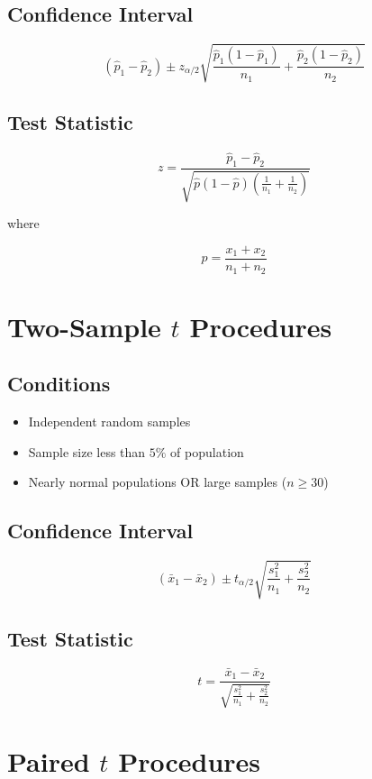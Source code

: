 \documentclass[11pt]{article}
\begin{document}
\subsection*{Confidence Interval}

\[
(\hat p_1 - \hat p_2)
\pm
z_{\alpha/2}
\sqrt{
\frac{\hat p_1(1-\hat p_1)}{n_1}
+
\frac{\hat p_2(1-\hat p_2)}{n_2}
}
\]

\subsection*{Test Statistic}

\[
z =
\frac{\hat p_1 - \hat p_2}
{\sqrt{\hat p(1-\hat p)
\left(\frac{1}{n_1}+\frac{1}{n_2}\right)}}
\]

where

\[
\hat p = \frac{x_1+x_2}{n_1+n_2}
\]

\section{Two-Sample $t$ Procedures}

\subsection*{Conditions}

\begin{itemize}
\item Independent random samples
\item Sample size less than $5\%$ of population
\item Nearly normal populations OR large samples ($n \ge 30$)
\end{itemize}

\subsection*{Confidence Interval}

\[
(\bar{x}_1 - \bar{x}_2)
\pm
t_{\alpha/2}
\sqrt{\frac{s_1^2}{n_1} + \frac{s_2^2}{n_2}}
\]

\subsection*{Test Statistic}

\[
t =
\frac{\bar{x}_1 - \bar{x}_2}
{\sqrt{\frac{s_1^2}{n_1} + \frac{s_2^2}{n_2}}}
\]

\section{Paired $t$ Procedures}
\end{document}
